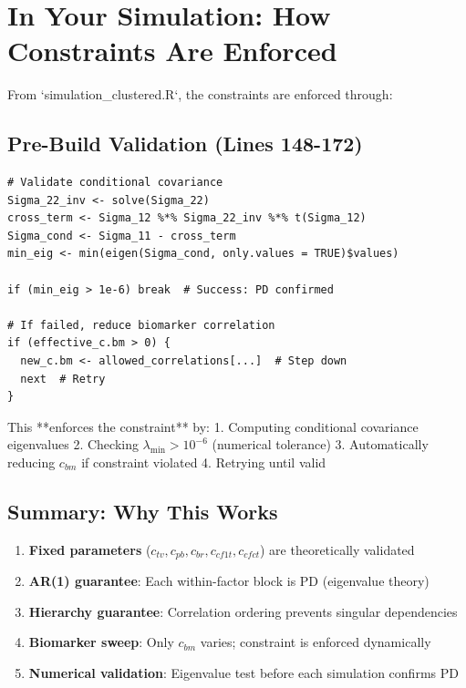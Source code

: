 \documentclass[12pt,a4paper]{article}
\theoremstyle{definition}
\begin{document}
\section{In Your Simulation: How Constraints Are Enforced}

From `simulation_clustered.R`, the constraints are enforced through:

\subsection{Pre-Build Validation (Lines 148-172)}

\begin{verbatim}
# Validate conditional covariance
Sigma_22_inv <- solve(Sigma_22)
cross_term <- Sigma_12 %*% Sigma_22_inv %*% t(Sigma_12)
Sigma_cond <- Sigma_11 - cross_term
min_eig <- min(eigen(Sigma_cond, only.values = TRUE)$values)

if (min_eig > 1e-6) break  # Success: PD confirmed

# If failed, reduce biomarker correlation
if (effective_c.bm > 0) {
  new_c.bm <- allowed_correlations[...]  # Step down
  next  # Retry
}
\end{verbatim}

This **enforces the constraint** by:
1. Computing conditional covariance eigenvalues
2. Checking $\lambda_{\min} > 10^{-6}$ (numerical tolerance)
3. Automatically reducing $c_{bm}$ if constraint violated
4. Retrying until valid

\subsection{Summary: Why This Works}

\begin{enumerate}
  \item \textbf{Fixed parameters} ($c_{tv}, c_{pb}, c_{br}, c_{cf1t}, c_{cfct}$) are theoretically validated

  \item \textbf{AR(1) guarantee}: Each within-factor block is PD (eigenvalue theory)

  \item \textbf{Hierarchy guarantee}: Correlation ordering prevents singular dependencies

  \item \textbf{Biomarker sweep}: Only $c_{bm}$ varies; constraint is enforced dynamically

  \item \textbf{Numerical validation}: Eigenvalue test before each simulation confirms PD
\end{enumerate}
\end{document}
